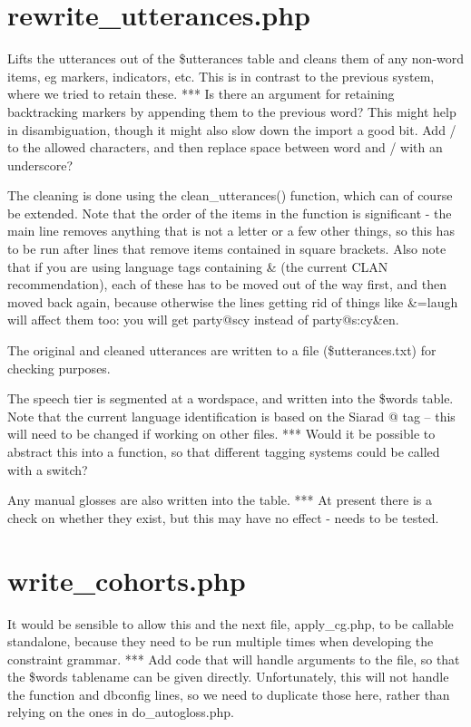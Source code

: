 \documentclass[a4paper,10pt]{article}
\begin{document}
\section{rewrite\_utterances.php}
\label{sec:rewrite}

Lifts the utterances out of the \$utterances table and cleans them of any non-word items, eg markers, indicators, etc.  This is in contrast to the previous system, where we tried to retain these.
*** Is there an argument for retaining backtracking markers by appending them to the previous word?  This might help in disambiguation, though it might also slow down the import a good bit.  Add / to the allowed characters, and then replace space between word and / with an underscore?

The cleaning is done using the clean\_utterances() function, which can of course be extended.  Note that the order of the items in the function is significant - the main line removes anything that is not a letter or a few other things, so this has to be run after lines that remove items contained in square brackets.  Also note that if you are using language tags containing \& (the current CLAN recommendation), each of these has to be moved out of the way first, and then moved back again, because otherwise the lines getting rid of things like \&=laugh will affect them too: you will get party@scy instead of party@s:cy\&en.

The original and cleaned utterances are written to a file (\$utterances.txt) for checking purposes.

The speech tier is segmented at a wordspace, and written into the \$words table.  Note that the current language identification is based on the Siarad @ tag -- this will need to be changed if working on other files.
*** Would it be possible to abstract this into a function, so that different tagging systems could be called with a switch?

Any manual glosses are also written into the table.
*** At present there is a check on whether they exist, but this may have no effect - needs to be tested.


\section{write\_cohorts.php}
\label{sec:cohorts}

It would be sensible to allow this and the next file, apply\_cg.php, to be callable standalone, because they need to be run multiple times when developing the constraint grammar.
*** Add code that will handle arguments to the file, so that the \$words tablename can be given directly.  Unfortunately, this will not handle the function and dbconfig lines, so we need to duplicate those here, rather than relying on the ones in do\_autogloss.php.
\end{document}
